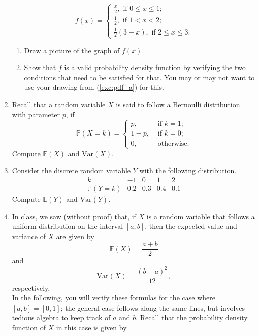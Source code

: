 \documentclass[12pt, reqno]{amsart}
\newcommand{\Pe}{\mathbb{P}}
\newcommand{\E}{\mathbb{E}}
\newcommand{\Var}{\mathrm{Var}}
\theoremstyle{remark}
\begin{document}
\begin{enumerate}
\[          f(x)=
          \begin{cases}
               \frac{x}{2},\text{ if }0\leq x\leq 1;\\
               \frac{1}{2},\text{ if }1< x <2;\\
               \frac{1}{2}(3-x),\text{ if }2\leq x\leq 3.
          \end{cases}\]
     \begin{enumerate}
          \item\label{exc:pdf_a} Draw a picture of the graph of \(f(x)\).
          \item\label{exc:pdf_b} Show that \(f\) is a valid probability density function by verifying the two conditions that need to be satisfied for that. You may or may not want to use your drawing from (\ref{exc:pdf_a}) for this.
     \end{enumerate}
     \item\label{exc:bernoulli} Recall that a random variable \(X\) is said to follow a Bernoulli distribution with parameter \(p\), if \[
          \Pe(X=k)=
          \begin{cases}
               p,&\text{ if }k=1;\\
               1-p,&\text{ if }k=0;\\
               0,&\text{ otherwise}.
          \end{cases}\]
          Compute \(\E(X)\) and \(\Var(X)\).
     \item\label{exc:synthetic} Consider the discrete random variable \(Y\) with the following distribution.
          \[\begin{array}{c||c|c|c|c}
               k        & -1  & 0   & 1   & 2 \\
               \hline
               \Pe(Y=k) & 0.2 & 0.3 & 0.4 & 0.1
          \end{array}\]
          Compute \(\E(Y)\) and \(\Var(Y)\).
     \item\label{exc:uniform} In class, we saw (without proof) that, if \(X\) is a random variable that follows a uniform distribution on the interval \([a, b]\), then the expected value and variance of \(X\) are given by \[
          \E(X) = \frac{a+b}{2}\]
          and \[
          \Var(X)=\frac{(b-a)^{2}}{12},\]
          respectively.\\
          In the following, you will verify these formulas for the case where \([a, b]=[0,1]\); the general case follows along the same lines, but involves tedious algebra to keep track of \(a\) and \(b\).
          Recall that the probability density function of \(X\) in this case is given by \[
\]
\end{enumerate}
\end{document}
